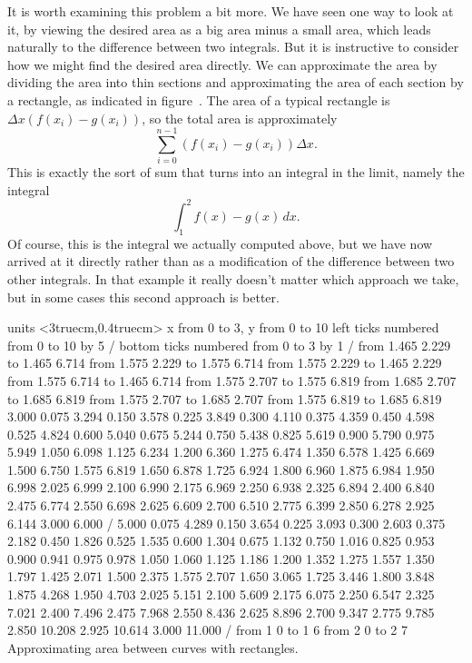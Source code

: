 It is worth examining this problem a bit more. We have seen one way to
look at it, by viewing the desired area as a big area minus a small
area, which leads naturally to the difference between two
integrals. But it is instructive to consider how we might find the
desired area directly. We can approximate the area by dividing the
area into thin sections and approximating the area of each section by
a rectangle, as indicated in 
figure~. 
The area of a typical rectangle is 
$\Delta x(f(x_i)-g(x_i))$, so the total area is approximately
$$\sum_{i=0}^{n-1} (f(x_i)-g(x_i))\Delta x.$$
This is exactly the sort of sum that turns into an integral in the
limit, namely the integral
$$\int_1^2 f(x)-g(x)\,dx.$$
Of course, this is the integral we actually computed above, but we
have now arrived at it directly rather than as a modification of the
difference between two other integrals. In that example it really
doesn't matter which approach we take, but in some cases this second
approach is better.

\figure
\texonly
\vbox{\beginpicture
\normalgraphs
\ninepoint
\setcoordinatesystem units <3truecm,0.4truecm>
\setplotarea x from 0 to 3, y from 0 to 10
\axis left ticks numbered from 0 to 10 by 5 /
\axis bottom  ticks numbered from 0 to 3 by 1 /
\setquadratic
\putrule from 1.465 2.229 to 1.465 6.714
\putrule from 1.575 2.229 to 1.575 6.714
\putrule from 1.575 2.229 to 1.465 2.229
\putrule from 1.575 6.714 to 1.465 6.714
%
\putrule from 1.575 2.707 to 1.575 6.819
\putrule from 1.685 2.707 to 1.685 6.819
\putrule from 1.575 2.707 to 1.685 2.707
\putrule from 1.575 6.819 to 1.685 6.819
 3.000 0.075 3.294 0.150 3.578 0.225 3.849 0.300 4.110 
0.375 4.359 0.450 4.598 0.525 4.824 0.600 5.040 0.675 5.244 
0.750 5.438 0.825 5.619 0.900 5.790 0.975 5.949 1.050 6.098 
1.125 6.234 1.200 6.360 1.275 6.474 1.350 6.578 1.425 6.669 
1.500 6.750 1.575 6.819 1.650 6.878 1.725 6.924 1.800 6.960 
1.875 6.984 1.950 6.998 2.025 6.999 2.100 6.990 2.175 6.969 
2.250 6.938 2.325 6.894 2.400 6.840 2.475 6.774 2.550 6.698 
2.625 6.609 2.700 6.510 2.775 6.399 2.850 6.278 2.925 6.144 
3.000 6.000 /
 5.000 0.075 4.289 0.150 3.654 0.225 3.093 0.300 2.603 
0.375 2.182 0.450 1.826 0.525 1.535 0.600 1.304 0.675 1.132 
0.750 1.016 0.825 0.953 0.900 0.941 0.975 0.978 1.050 1.060 
1.125 1.186 1.200 1.352 1.275 1.557 1.350 1.797 1.425 2.071 
1.500 2.375 1.575 2.707 1.650 3.065 1.725 3.446 1.800 3.848 
1.875 4.268 1.950 4.703 2.025 5.151 2.100 5.609 2.175 6.075 
2.250 6.547 2.325 7.021 2.400 7.496 2.475 7.968 2.550 8.436 
2.625 8.896 2.700 9.347 2.775 9.785 2.850 10.208 2.925 10.614 
3.000 11.000 /
\setdashes
\putrule from 1 0 to 1 6
\putrule from 2 0 to 2 7
\setsolid
\endpicture}
\endtexonly
{}
\begincaption
Approximating area between curves with rectangles.
\endcaption
\endfigure

